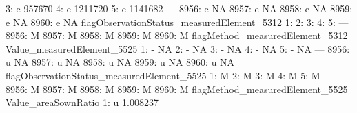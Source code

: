 \documentclass[nojss]{jss}
\begin{document}
\begin{Schunk}
\begin{Soutput}
   3:                               e                     957670
   4:                               e                    1211720
   5:                               e                    1141682
  ---                                                           
8956:                               e                         NA
8957:                               e                         NA
8958:                               e                         NA
8959:                               e                         NA
8960:                               e                         NA
      flagObservationStatus_measuredElement_5312
   1:                                           
   2:                                           
   3:                                           
   4:                                           
   5:                                           
  ---                                           
8956:                                          M
8957:                                          M
8958:                                          M
8959:                                          M
8960:                                          M
      flagMethod_measuredElement_5312 Value_measuredElement_5525
   1:                               -                         NA
   2:                               -                         NA
   3:                               -                         NA
   4:                               -                         NA
   5:                               -                         NA
  ---                                                           
8956:                               u                         NA
8957:                               u                         NA
8958:                               u                         NA
8959:                               u                         NA
8960:                               u                         NA
      flagObservationStatus_measuredElement_5525
   1:                                          M
   2:                                          M
   3:                                          M
   4:                                          M
   5:                                          M
  ---                                           
8956:                                          M
8957:                                          M
8958:                                          M
8959:                                          M
8960:                                          M
      flagMethod_measuredElement_5525 Value_areaSownRatio
   1:                               u            1.008237

\end{Soutput}
\end{Schunk}
\end{document}
